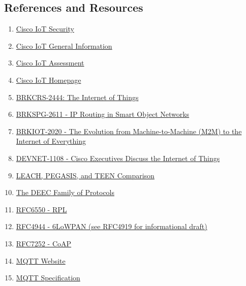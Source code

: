 \subsection{References and Resources}
\begin{enumerate}
  \item \href{http://www.cisco.com/c/en/us/about/security-center/secure-iot-proposed-framework.html}{Cisco IoT Security}
  \item \href{http://www.cisco.com/c/r/en/us/internet-of-everything-ioe/internet-of-things-iot/index.html}{Cisco IoT General Information}
  \item \href{http://ioeassessment.cisco.com/}{Cisco IoT Assessment}
  \item \href{http://www.cisco.com/go/iot}{Cisco IoT Homepage}
  \item \href{https://www.ciscolive.com/online/connect/sessionDetail.ww?SESSION_ID=76308&backBtn=true}{BRKCRS-2444: The Internet of Things}
  \item \href{https://www.ciscolive.com/online/connect/sessionDetail.ww?SESSION_ID=3138&backBtn=true}{BRKSPG-2611 - IP Routing in Smart Object Networks}
  \item \href{https://www.ciscolive.com/online/connect/sessionDetail.ww?SESSION_ID=78943&backBtn=true}{BRKIOT-2020 - The Evolution from Machine-to-Machine (M2M) to the Internet of Everything}
  \item \href{https://www.ciscolive.com/online/connect/sessionDetail.ww?SESSION_ID=84177&backBtn=true}{DEVNET-1108 - Cisco Executives Discuss the Internet of Things}
  \item \href{https://ieeexplore.ieee.org/document/7414810/}{LEACH, PEGASIS, and TEEN Comparison}
  \item \href{https://www.researchgate.net/publication/322411068_Performance_Analysis_of_Heterogenous_WSN_for_application_in_IoT}{The DEEC Family of Protocols}
  \item \href{https://tools.ietf.org/html/rfc6550}{RFC6550 - RPL}
  \item \href{https://tools.ietf.org/html/rfc4944}{RFC4944 - 6LoWPAN (see RFC4919 for informational draft)}
  \item \href{https://tools.ietf.org/html/rfc7252}{RFC7252 - CoAP}
  \item \href{http://mqtt.org}{MQTT Website}
  \item \href{https://www.iso.org/standard/69466.html}{MQTT Specification}
\end{enumerate}
